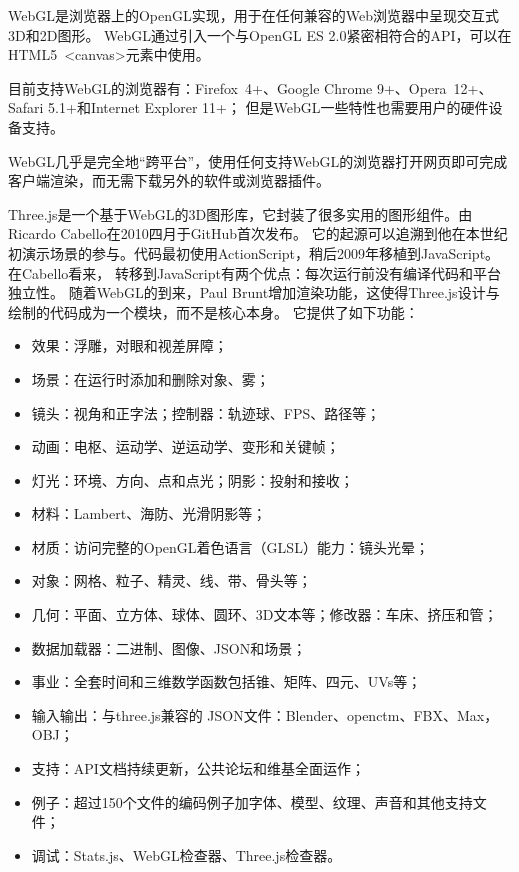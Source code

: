 WebGL是浏览器上的OpenGL实现，用于在任何兼容的Web浏览器中呈现交互式3D和2D图形\cite{webgl}。
WebGL通过引入一个与OpenGL ES 2.0紧密相符合的API，可以在HTML5 <canvas>元素中使用。

目前支持WebGL的浏览器有：Firefox 4+、Google Chrome 9+、Opera 12+、Safari 5.1+和Internet Explorer 11+；
但是WebGL一些特性也需要用户的硬件设备支持。

WebGL几乎是完全地“跨平台”，使用任何支持WebGL的浏览器打开网页即可完成客户端渲染，而无需下载另外的软件或浏览器插件。

Three.js是一个基于WebGL的3D图形库\cite{threejs}，它封装了很多实用的图形组件。由Ricardo Cabello在2010四月于GitHub首次发布。
它的起源可以追溯到他在本世纪初演示场景的参与。代码最初使用ActionScript，稍后2009年移植到JavaScript。在Cabello看来，
转移到JavaScript有两个优点：每次运行前没有编译代码和平台独立性。
随着WebGL的到来，Paul Brunt增加渲染功能，这使得Three.js设计与绘制的代码成为一个模块，而不是核心本身。
它提供了如下功能：

\begin{itemize}
    \item 效果：浮雕，对眼和视差屏障；
    \item 场景：在运行时添加和删除对象、雾；
    \item 镜头：视角和正字法；控制器：轨迹球、FPS、路径等；
    \item 动画：电枢、运动学、逆运动学、变形和关键帧；
    \item 灯光：环境、方向、点和点光；阴影：投射和接收；
    \item 材料：Lambert、海防、光滑阴影等；
    \item 材质：访问完整的OpenGL着色语言（GLSL）能力：镜头光晕；
    \item 对象：网格、粒子、精灵、线、带、骨头等；
    \item 几何：平面、立方体、球体、圆环、3D文本等；修改器：车床、挤压和管；
    \item 数据加载器：二进制、图像、JSON和场景；
    \item 事业：全套时间和三维数学函数包括锥、矩阵、四元、UVs等；
    \item 输入输出：与three.js兼容的 JSON文件：Blender、openctm、FBX、Max，OBJ；
    \item 支持：API文档持续更新，公共论坛和维基全面运作；
    \item 例子：超过150个文件的编码例子加字体、模型、纹理、声音和其他支持文件；
    \item 调试：Stats.js、WebGL检查器、Three.js检查器。
\end{itemize}

